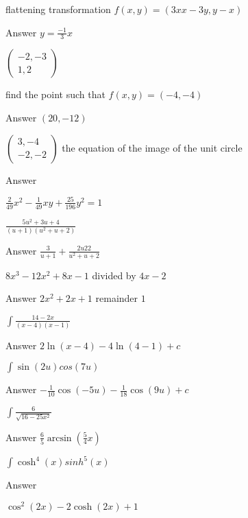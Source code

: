 \documentclass{article}
\begin{document}
\begin{question}

    flattening transformation
\( f(x,y) = (3xx-3y,y-x) \)

Answer
\(y=\frac{-1}{3}x\)

\end{question}

\begin{question}

\(
\begin{pmatrix}
-2,-3\\
1,2
\end{pmatrix}
\)

find the point such that
\(f(x,y) = (-4,-4)\)

Answer
\( (20,-12) \)

\end{question}

\begin{question}

\(
\begin{pmatrix}
    3,-4\\
    -2,-2
\end{pmatrix}
\)
the equation of the image of the unit circle

Answer

\( \frac{2}{49}x^2 -\frac{1}{49}xy+ \frac{25}{196}y^2=1 \)

\end{question}

\begin{question}
\( \frac{5u^2 +3u +4}{(u+1)(u^2+u+2)} \)

Answer
\( \frac{3}{u+1} + \frac{2u22}{u^2+u+2} \)
\end{question}

\begin{question}
\( 8x^3-12x^2+8x-1 \) divided by \( 4x-2 \)

Answer
\( 2x^2+2x+1 \) remainder \(1\)
\end{question}

\begin{question}

\( \int \frac{14-2x}{(x-4)(x-1)} \)

Answer
\( 2\ln(x-4) -4\ln(4-1)+c \)

\end{question}

\begin{question}

\( \int \sin(2u)cos(7u ) \)

Answer
\( -\frac{1}{10}\cos(-5u) - \frac{1}{18}\cos(9u) + c \)

\end{question}

\begin{question}

\( \int \frac{6}{\sqrt{16-25x^2}} \)

Answer
\( \frac{6}{5}\arcsin(\frac{5}{4}x) \)

\end{question}

\begin{question}

\( \int \cosh^4(x)sinh^5(x) \)

Answer

    \( \cos^2(2x) -2\cosh(2x) +1 \)

\end{question}
\end{document}
